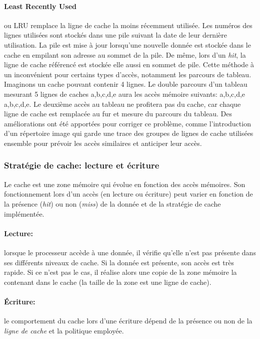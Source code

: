 \paragraph{Least Recently Used} ou LRU remplace la ligne de cache la moins récemment utilisée. Les numéros des lignes utilisées sont stockés dans une pile suivant la date de leur dernière utilisation. La pile est mise à jour lorsqu'une nouvelle donnée est stockée dans le cache en empilant son adresse au sommet de la pile. De même, lors d'un \textit{hit}, la ligne de cache référencé est stockée elle aussi en sommet de pile. Cette méthode à un inconvénient pour certains types d'accès, notamment les parcours de tableau. Imaginons un cache pouvant contenir 4 lignes. Le double parcours d'un tableau mesurant 5 lignes de caches a,b,c,d,e aura les accès mémoire suivants: a,b,c,d,e a,b,c,d,e. Le deuxième accès au tableau ne profitera pas du cache, car chaque ligne de cache est remplacée au fur et mesure du parcours du tableau. Des améliorations ont été apportées pour corriger ce problème, comme l'introduction d'un répertoire image \cite{Stone:1987:HCA:31845} qui garde une trace des groupes de lignes de cache utilisées ensemble pour prévoir les accès similaires et anticiper leur accès.







\subsubsection{Stratégie de cache: lecture et écriture}
Le cache est une zone mémoire qui évolue en fonction des accès mémoires. Son fonctionnement lors d'un accès (en lecture ou écriture) peut varier en fonction de la présence (\textit{hit}) ou non (\textit{miss}) de la donnée et de la stratégie de cache implémentée.

\paragraph{Lecture:}  lorsque le processeur accède à une donnée, il vérifie qu'elle n'est pas présente dans ses différents niveaux de cache. Si la donnée est présente, son accès est très rapide. Si ce n'est pas le cas, il réalise alors une copie de la zone mémoire la contenant dans le cache (la taille de la zone est une ligne de cache).

\paragraph{Écriture:} le comportement du cache lors d'une écriture dépend de la présence ou non de la \textit{ligne de cache} et la politique employée.


